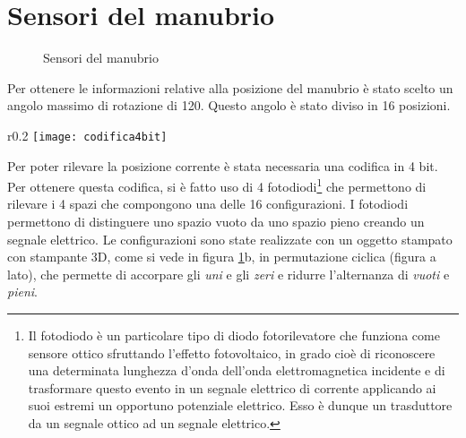 \section{Sensori del manubrio}
\begin{figure}%
    \centering
    \caption{Sensori del manubrio}%
    \label{manubrio}
\end{figure}
Per ottenere le informazioni relative alla posizione del manubrio è stato scelto un angolo massimo di rotazione di 120\degree. Questo angolo è stato diviso in 16 posizioni. \\
\begin{wrapfigure}{r}{0.2\textwidth} %
    \centering
    \vspace{-1.5cm}
    \texttt{[image: codifica4bit]}
\end{wrapfigure}
Per poter rilevare la posizione corrente è stata necessaria una codifica in 4 bit. Per ottenere questa codifica, si è fatto uso di 4 fotodiodi\footnote{Il fotodiodo è un particolare tipo di diodo fotorilevatore che funziona come sensore ottico sfruttando l'effetto fotovoltaico, in grado cioè di riconoscere una determinata lunghezza d'onda dell'onda elettromagnetica incidente e di trasformare questo evento in un segnale elettrico di corrente applicando ai suoi estremi un opportuno potenziale elettrico. Esso è dunque un trasduttore da un segnale ottico ad un segnale elettrico.} che permettono di rilevare i 4 spazi che compongono una delle 16 configurazioni. I fotodiodi permettono di distinguere uno spazio vuoto da uno spazio pieno creando un segnale elettrico. Le configurazioni sono state realizzate con un oggetto stampato con stampante 3D, come si vede in figura \ref{manubrio}b, in permutazione ciclica (figura a lato), che permette di accorpare gli \textit{uni} e gli \textit{zeri} e ridurre l'alternanza di \textit{vuoti} e \textit{pieni}.



